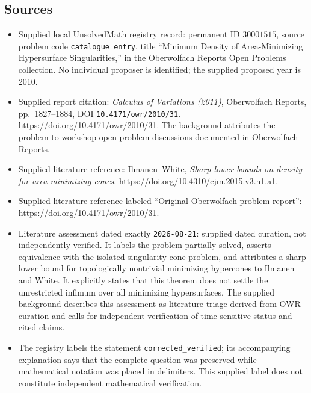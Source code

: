 \documentclass[11pt]{article}
\begin{document}
\subsection{Sources}
\begin{itemize}
\item Supplied local UnsolvedMath registry record: permanent ID \(30001515\), source problem code \texttt{catalogue entry}, title ``Minimum Density of Area-Minimizing Hypersurface Singularities,'' in the Oberwolfach Reports Open Problems collection. No individual proposer is identified; the supplied proposed year is 2010.
\item Supplied report citation: \emph{Calculus of Variations (2011)}, Oberwolfach Reports, pp.\ 1827--1884, DOI \texttt{10.4171/owr/2010/31}. \url{https://doi.org/10.4171/owr/2010/31}. The background attributes the problem to workshop open-problem discussions documented in Oberwolfach Reports.
\item Supplied literature reference: Ilmanen--White, \emph{Sharp lower bounds on density for area-minimizing cones}. \url{https://doi.org/10.4310/cjm.2015.v3.n1.a1}.
\item Supplied literature reference labeled ``Original Oberwolfach problem report'': \url{https://doi.org/10.4171/owr/2010/31}.
\item Literature assessment dated exactly \texttt{2026-08-21}: supplied dated curation, not independently verified. It labels the problem partially solved, asserts equivalence with the isolated-singularity cone problem, and attributes a sharp lower bound for topologically nontrivial minimizing hypercones to Ilmanen and White. It explicitly states that this theorem does not settle the unrestricted infimum over all minimizing hypersurfaces. The supplied background describes this assessment as literature triage derived from OWR curation and calls for independent verification of time-sensitive status and cited claims.
\item The registry labels the statement \texttt{corrected\_verified}; its accompanying explanation says that the complete question was preserved while mathematical notation was placed in delimiters. This supplied label does not constitute independent mathematical verification.
\end{itemize}
\end{document}
